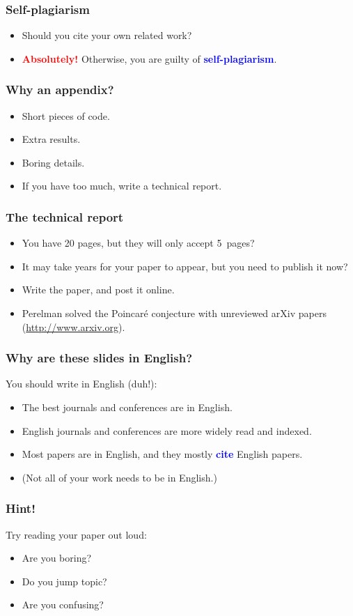 \documentclass[handout]{beamer}
\newcommand{\vimportant}[1]{\textcolor{red}{\textbf{#1}}}
\newcommand{\important}[1]{\textcolor{blue}{\textbf{#1}}}
\begin{document}
\frame
{
  \frametitle{Self-plagiarism}
   \begin{itemize}
  \item<1-> Should you cite your own related work?
  \item<2-> \vimportant{Absolutely!} Otherwise, you are guilty of \important{self-plagiarism}.
    \end{itemize}
}

\frame
{
  \frametitle{Why an appendix?}

  \begin{itemize}
  \item<1-> Short pieces of code.
    \item<2-> Extra results.
    \item<3-> Boring details.
        \item<4-> If you have too much, write a technical report.
  \end{itemize}
}

\frame
{
  \frametitle{The technical report}

  \begin{itemize}
  \item<1-> You have 20 pages, but they will only accept 5~pages?
    \item<2-> It may take years for your paper to appear, but you need to publish it now?
    \item<3-> Write the paper, and post it online.
        \item<4-> Perelman solved the Poincar\'e conjecture with unreviewed arXiv papers (\url{http://www.arxiv.org}).
  \end{itemize}
}

\frame
{
  \frametitle{Why are these slides in English?}
  You should write in English (duh!):
  \begin{itemize}
  \item<1-> The best journals and conferences are in English.
    \item<2-> English journals and conferences are more widely read and indexed.
    \item<3-> Most papers are in English, and they mostly \important{cite} English papers.
    \item<4-> (Not all of your work needs to be in English.)
  \end{itemize}
}


\frame
{
  \frametitle{Hint!}
  Try reading your paper out loud:
  \begin{itemize}
  \item<1-> Are you boring?
    \item<2-> Do you jump topic?
    \item<3-> Are you confusing?
  \end{itemize}
}
\end{document}
